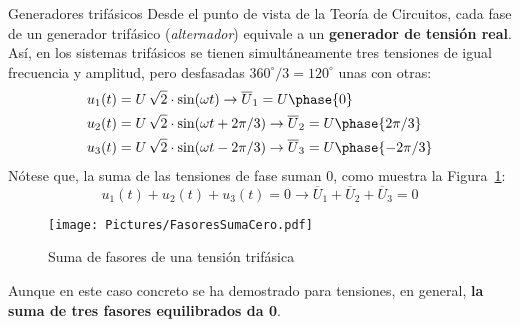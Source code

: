 \documentclass[11pt]{book} %
\makeatletter
\numberwithin{dummy}{section}
\theoremstyle{ocrenumbox}
\theoremstyle{blacknumex}
\theoremstyle{blacknumbox}
\theoremstyle{ocrenum}
\newenvironment{remark}{\par\vspace{10pt}\small %
\begin{list}{}{
\leftmargin=35pt %
\rightmargin=25pt}\item\ignorespaces %
\makebox[-2.5pt]{\begin{tikzpicture}[overlay]
\node[draw=ocre!60,line width=1pt,circle,fill=ocre!25,font=\sffamily\bfseries,inner sep=2pt,outer sep=0pt] at (-15pt,0pt){\textcolor{ocre}{N}};\end{tikzpicture}} %
\advance\baselineskip -1pt}{\end{list}\vskip5pt} %
\renewcommand{\section}{\@startsection{section}{1}{\z@}
{-4ex \@plus -1ex \@minus -.4ex}
{1ex \@plus.2ex }
{\normalfont\large\sffamily\bfseries}}
\newlength\esp
\makeatother
\begin{document}
	\section{Generadores trifásicos}
	Desde el punto de vista de la Teoría de Circuitos, cada fase de un generador trifásico (\textit{alternador}) equivale a un \textbf{generador de tensión real}. Así, en los sistemas trifásicos se tienen simultáneamente tres tensiones de igual frecuencia y amplitud, pero desfasadas $360^\circ/3=120^\circ$ unas con otras:
	\begin{align*}
		u_1(t) &= U\,\sqrt{2}\cdot \sin(\omega t)\rightarrow  \overline{U}_1 = U\phase{0}\\
		u_2(t) &= U\,\sqrt{2} \cdot\sin(\omega t + 2\pi/3) \rightarrow  \overline{U}_2 = U\phase{2\pi/3}\\
		u_3(t) &= U\,\sqrt{2}\cdot \sin(\omega t - 2\pi/3) \rightarrow  \overline{U}_3 = U\phase{-2\pi/3}
	\end{align*}
	Nótese que, la suma de las tensiones de fase suman 0, como muestra la Figura~\ref{fig.fasoressumacero}:
	\begin{equation*}
		u_1(t) + u_2(t) + u_3(t) = 0\rightarrow \overline{U}_1 + \overline{U}_2 + \overline{U}_3 = 0
	\end{equation*}
	\begin{figure}
		\centering
		\texttt{[image: Pictures/FasoresSumaCero.pdf]}
		\caption{Suma de fasores de una tensión trifásica}
		\label{fig.fasoressumacero}
	\end{figure}
	\begin{remark}
	    Aunque en este caso concreto se ha demostrado para tensiones, en general, \textbf{la suma de tres fasores equilibrados da 0}.
	\end{remark}
	
\end{document}
